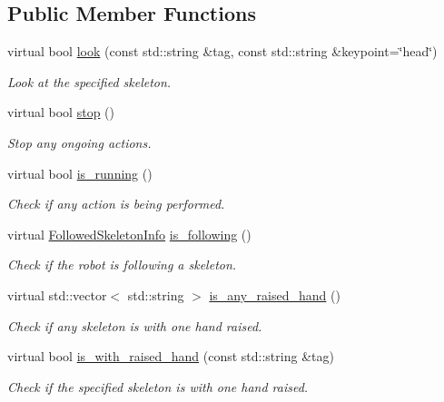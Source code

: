 \subsection*{Public Member Functions}
\begin{DoxyCompactItemize}
\item 
virtual bool \mbox{\hyperlink{classattentionManager__IDL_a42941cc508bb57aa390578ecdbfde7c2}{look}} (const std\+::string \&tag, const std\+::string \&keypoint=\char`\"{}head\char`\"{})
\begin{DoxyCompactList}\small\item\em Look at the specified skeleton. \end{DoxyCompactList}\item 
virtual bool \mbox{\hyperlink{classattentionManager__IDL_aa5e3fb18a0336d8b65c316e7f6a675a8}{stop}} ()
\begin{DoxyCompactList}\small\item\em Stop any ongoing actions. \end{DoxyCompactList}\item 
virtual bool \mbox{\hyperlink{classattentionManager__IDL_ada750e5a7c6a0bb99be495e24d34dcdd}{is\+\_\+running}} ()
\begin{DoxyCompactList}\small\item\em Check if any action is being performed. \end{DoxyCompactList}\item 
virtual \mbox{\hyperlink{classFollowedSkeletonInfo}{Followed\+Skeleton\+Info}} \mbox{\hyperlink{classattentionManager__IDL_a03b844a8bd3d6e2b4cf5ba88ace27429}{is\+\_\+following}} ()
\begin{DoxyCompactList}\small\item\em Check if the robot is following a skeleton. \end{DoxyCompactList}\item 
virtual std\+::vector$<$ std\+::string $>$ \mbox{\hyperlink{classattentionManager__IDL_ad0b7882cea4dd8b0269cd3eaf0f5dbae}{is\+\_\+any\+\_\+raised\+\_\+hand}} ()
\begin{DoxyCompactList}\small\item\em Check if any skeleton is with one hand raised. \end{DoxyCompactList}\item 
virtual bool \mbox{\hyperlink{classattentionManager__IDL_aa6b2c971be0e878ab259675c83bba2dc}{is\+\_\+with\+\_\+raised\+\_\+hand}} (const std\+::string \&tag)
\begin{DoxyCompactList}\small\item\em Check if the specified skeleton is with one hand raised. \end{DoxyCompactList}\item 

\end{DoxyCompactItemize}
